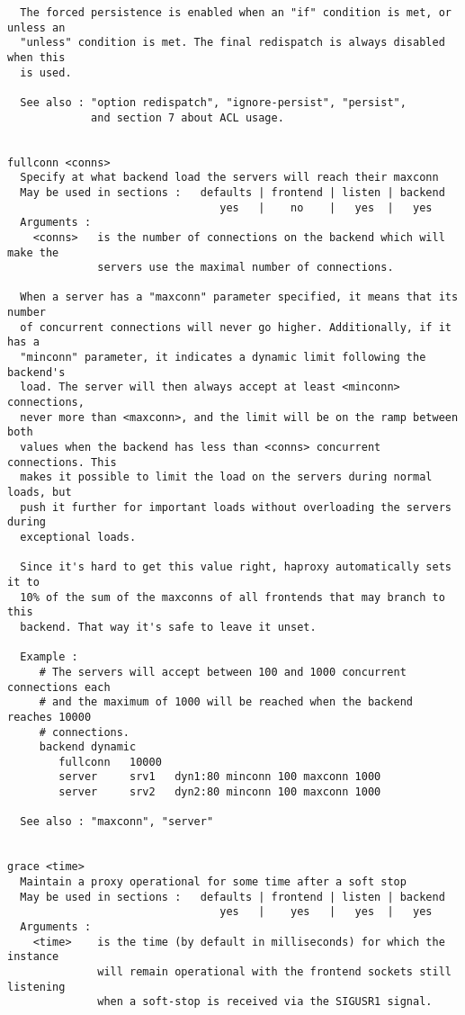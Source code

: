 \begin{verbatim}
  The forced persistence is enabled when an "if" condition is met, or unless an
  "unless" condition is met. The final redispatch is always disabled when this
  is used.

  See also : "option redispatch", "ignore-persist", "persist",
             and section 7 about ACL usage.


fullconn <conns>
  Specify at what backend load the servers will reach their maxconn
  May be used in sections :   defaults | frontend | listen | backend
                                 yes   |    no    |   yes  |   yes
  Arguments :
    <conns>   is the number of connections on the backend which will make the
              servers use the maximal number of connections.

  When a server has a "maxconn" parameter specified, it means that its number
  of concurrent connections will never go higher. Additionally, if it has a
  "minconn" parameter, it indicates a dynamic limit following the backend's
  load. The server will then always accept at least <minconn> connections,
  never more than <maxconn>, and the limit will be on the ramp between both
  values when the backend has less than <conns> concurrent connections. This
  makes it possible to limit the load on the servers during normal loads, but
  push it further for important loads without overloading the servers during
  exceptional loads.

  Since it's hard to get this value right, haproxy automatically sets it to
  10% of the sum of the maxconns of all frontends that may branch to this
  backend. That way it's safe to leave it unset.

  Example :
     # The servers will accept between 100 and 1000 concurrent connections each
     # and the maximum of 1000 will be reached when the backend reaches 10000
     # connections.
     backend dynamic
        fullconn   10000
        server     srv1   dyn1:80 minconn 100 maxconn 1000
        server     srv2   dyn2:80 minconn 100 maxconn 1000

  See also : "maxconn", "server"


grace <time>
  Maintain a proxy operational for some time after a soft stop
  May be used in sections :   defaults | frontend | listen | backend
                                 yes   |    yes   |   yes  |   yes
  Arguments :
    <time>    is the time (by default in milliseconds) for which the instance
              will remain operational with the frontend sockets still listening
              when a soft-stop is received via the SIGUSR1 signal.


\end{verbatim}
